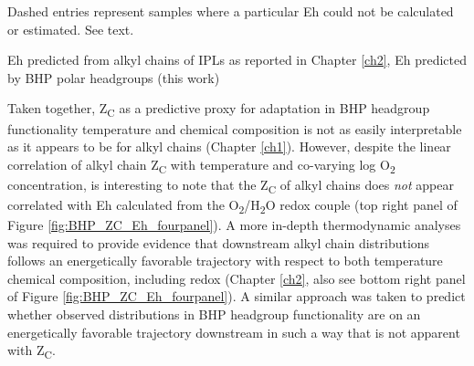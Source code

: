 {\begin{table}
\begin{threeparttable}
  \begin{tablenotes}
    Dashed entries represent samples where a particular Eh could not be calculated or estimated. See text.
    
     Eh predicted from alkyl chains of IPLs as reported in Chapter \ref{ch2},
     Eh predicted by BHP polar headgroups (this work)
        
  \end{tablenotes}
  
  \label{tab:BHP_redox_table}
  \end{threeparttable}
\end{table}
\doublespace
\setcounter{tabcounter}{0} %
\clearpage
}

Taken together, Z\textsubscript{C} as a predictive proxy for adaptation in BHP headgroup functionality temperature and chemical composition is not as easily interpretable as it appears to be for alkyl chains (Chapter \ref{ch1}). However, despite the linear correlation of alkyl chain Z\textsubscript{C} with temperature and co-varying log O\textsubscript{2} concentration, is interesting to note that the Z\textsubscript{C} of alkyl chains does \textit{not} appear correlated with Eh calculated from the O\textsubscript{2}/H\textsubscript{2}O redox couple (top right panel of Figure \ref{fig:BHP_ZC_Eh_fourpanel}). A more in-depth thermodynamic analyses was required to provide evidence that downstream alkyl chain distributions follows an energetically favorable trajectory with respect to both temperature chemical composition, including redox (Chapter \ref{ch2}, also see bottom right panel of Figure \ref{fig:BHP_ZC_Eh_fourpanel}). A similar approach was taken to predict whether observed distributions in BHP headgroup functionality are on an energetically favorable trajectory downstream in such a way that is not apparent with Z\textsubscript{C}.

